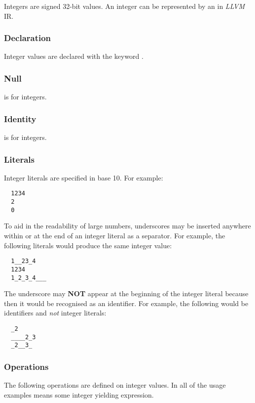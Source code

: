 \documentclass[types.tex]{subfiles}
\begin{document}
Integers are signed 32-bit values. An integer can be represented by an  in \textit{LLVM}
IR.

\subsubsection{Declaration}
\label{sssec:integer_decl}
Integer values are declared with the keyword .

\subsubsection{Null}
\label{sssec:integer_null}
 is  for integers.

\subsubsection{Identity}
\label{sssec:integer_ident}
 is  for integers.

\subsubsection{Literals}
\label{sssec:int_lit}
Integer literals are specified in base 10. For example:
\begin{lstlisting}
  1234
  2
  0
\end{lstlisting}

To aid in the readability of large numbers, underscores may be inserted anywhere within or at the
end of an integer literal as a separator. For example, the following literals would produce the same
integer value:
\begin{lstlisting}
  1__23_4
  1234
  1_2_3_4___
\end{lstlisting}

The underscore may \textbf{NOT} appear at the beginning of the integer literal because then it would
be recognised as an identifier. For example, the following would be identifiers and \textit{not}
integer literals:
\begin{lstlisting}
  _2
  ____2_3
  _2__3_
\end{lstlisting}

\subsubsection{Operations}
The following operations are defined on integer values. In all of the usage examples 
means some integer yielding expression.
\end{document}
